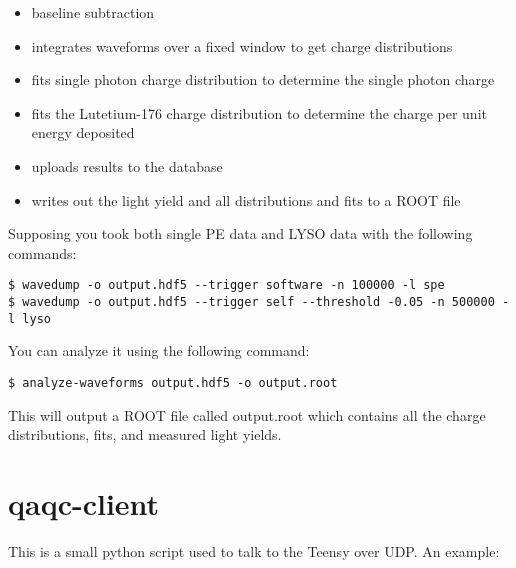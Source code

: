 \documentclass[12pt,openright,twoside]{report}
\begin{document}
\begin{itemize}
\item baseline subtraction
\item integrates waveforms over a fixed window to get charge distributions
\item fits single photon charge distribution to determine the single photon charge
\item fits the Lutetium-176 charge distribution to determine the charge per unit energy deposited
\item uploads results to the database
\item writes out the light yield and all distributions and fits to a ROOT file
\end{itemize}

Supposing you took both single PE data and LYSO data with the following commands:

\begin{mdframed}[backgroundcolor=light-gray, roundcorner=10pt,leftmargin=1, rightmargin=1, innerleftmargin=15, innertopmargin=15,innerbottommargin=15, outerlinewidth=1, linecolor=light-gray]
\begin{lstlisting}
$ wavedump -o output.hdf5 --trigger software -n 100000 -l spe
$ wavedump -o output.hdf5 --trigger self --threshold -0.05 -n 500000 -l lyso
\end{lstlisting}
\end{mdframed}

You can analyze it using the following command:

\begin{mdframed}[backgroundcolor=light-gray, roundcorner=10pt,leftmargin=1, rightmargin=1, innerleftmargin=15, innertopmargin=15,innerbottommargin=15, outerlinewidth=1, linecolor=light-gray]
\begin{lstlisting}
$ analyze-waveforms output.hdf5 -o output.root
\end{lstlisting}
\end{mdframed}

This will output a ROOT file called output.root which contains all the charge distributions, fits, and measured light yields.

\section{qaqc-client}
\label{sec:qaqc-client}

This is a small python script used to talk to the Teensy over UDP. An example:
\end{document}
